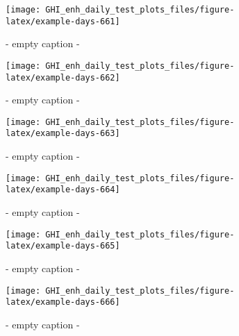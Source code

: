 \documentclass[
  10pt,
  a4paper,oneside]{article}
\begin{document}
\begin{figure}[H]

{\centering \texttt{[image: GHI\_enh\_daily\_test\_plots\_files/figure-latex/example-days-661]} 

}

\caption{ - empty caption - }\label{fig:example-days-661}
\end{figure}

\begin{figure}[H]

{\centering \texttt{[image: GHI\_enh\_daily\_test\_plots\_files/figure-latex/example-days-662]} 

}

\caption{ - empty caption - }\label{fig:example-days-662}
\end{figure}

\begin{figure}[H]

{\centering \texttt{[image: GHI\_enh\_daily\_test\_plots\_files/figure-latex/example-days-663]} 

}

\caption{ - empty caption - }\label{fig:example-days-663}
\end{figure}

\begin{figure}[H]

{\centering \texttt{[image: GHI\_enh\_daily\_test\_plots\_files/figure-latex/example-days-664]} 

}

\caption{ - empty caption - }\label{fig:example-days-664}
\end{figure}

\begin{figure}[H]

{\centering \texttt{[image: GHI\_enh\_daily\_test\_plots\_files/figure-latex/example-days-665]} 

}

\caption{ - empty caption - }\label{fig:example-days-665}
\end{figure}

\begin{figure}[H]

{\centering \texttt{[image: GHI\_enh\_daily\_test\_plots\_files/figure-latex/example-days-666]} 

}

\caption{ - empty caption - }\label{fig:example-days-666}
\end{figure}
\end{document}
